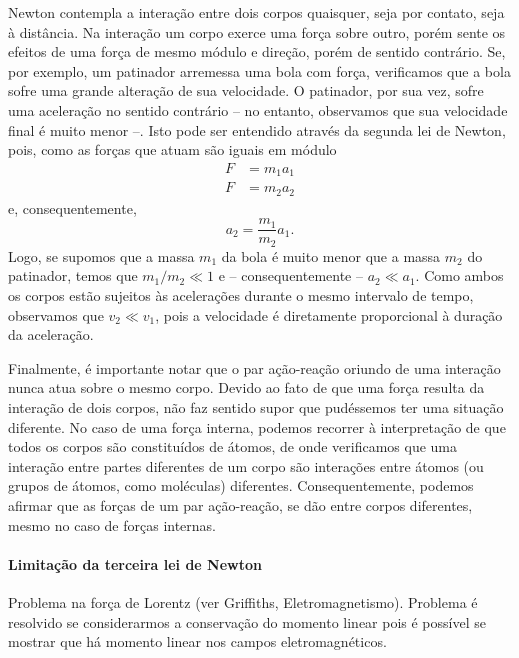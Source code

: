 Newton contempla a interação entre dois corpos quaisquer, seja por contato, seja à distância. Na interação um corpo exerce uma força sobre outro, porém sente os efeitos de uma força de mesmo módulo e direção, porém de sentido contrário. Se, por exemplo, um patinador arremessa uma bola com força, verificamos que a bola sofre uma grande alteração de sua velocidade. O patinador, por sua vez, sofre uma aceleração no sentido contrário -- no entanto, observamos que sua velocidade final é muito menor --. Isto pode ser entendido através da segunda lei de Newton, pois, como as forças que atuam são iguais em módulo
\begin{align}
  F &= m_1 a_1 \\
  F &= m_2 a_2
\end{align}
%
e, consequentemente,
\begin{equation}
  a_2 = \frac{m_1}{m_2} a_1.
\end{equation}
%
Logo, se supomos que a massa $m_1$ da bola é muito menor que a massa $m_2$ do patinador, temos que $m_1/m_2 \ll 1$ e -- consequentemente -- $a_2 \ll a_1$. Como ambos os corpos estão sujeitos às acelerações durante o mesmo intervalo de tempo, observamos que $v_2 \ll v_1$, pois a velocidade é diretamente proporcional à duração da aceleração.

Finalmente, é importante notar que o par ação-reação oriundo de uma interação nunca atua sobre o mesmo corpo. Devido ao fato de que uma força resulta da interação de dois corpos, não faz sentido supor que pudéssemos ter uma situação diferente. No caso de uma força interna, podemos recorrer à interpretação de que todos os corpos são constituídos de átomos, de onde verificamos que uma interação entre partes diferentes de um corpo são interações entre átomos (ou grupos de átomos, como moléculas) diferentes. Consequentemente, podemos afirmar que as forças de um par ação-reação, se dão entre corpos diferentes, mesmo no caso de forças internas.

\paragraph{Limitação da terceira lei de Newton}

Problema na força de Lorentz (ver Griffiths, Eletromagnetismo). Problema é resolvido se considerarmos a conservação do momento linear pois é possível se mostrar que há momento linear nos campos eletromagnéticos.

